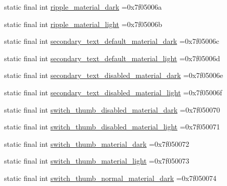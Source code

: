 \begin{DoxyCompactItemize}
\item 
static final int \mbox{\hyperlink{classbr_1_1unb_1_1cic_1_1mp_1_1marketmaster_1_1test_1_1R_1_1color_a2cbd224e0b149b5d8d99bd630850b3a3}{ripple\+\_\+material\+\_\+dark}} =0x7f05006a
\item 
static final int \mbox{\hyperlink{classbr_1_1unb_1_1cic_1_1mp_1_1marketmaster_1_1test_1_1R_1_1color_a64cb9dba74d31a5927d1c4c1df98b129}{ripple\+\_\+material\+\_\+light}} =0x7f05006b
\item 
static final int \mbox{\hyperlink{classbr_1_1unb_1_1cic_1_1mp_1_1marketmaster_1_1test_1_1R_1_1color_a6a5ced9689b83fcb9ed2a798d32bd301}{secondary\+\_\+text\+\_\+default\+\_\+material\+\_\+dark}} =0x7f05006c
\item 
static final int \mbox{\hyperlink{classbr_1_1unb_1_1cic_1_1mp_1_1marketmaster_1_1test_1_1R_1_1color_a4abc0ef09d23986b3fcf316ac119026e}{secondary\+\_\+text\+\_\+default\+\_\+material\+\_\+light}} =0x7f05006d
\item 
static final int \mbox{\hyperlink{classbr_1_1unb_1_1cic_1_1mp_1_1marketmaster_1_1test_1_1R_1_1color_a9d7f35df8f3fa9b85defa11812eb008f}{secondary\+\_\+text\+\_\+disabled\+\_\+material\+\_\+dark}} =0x7f05006e
\item 
static final int \mbox{\hyperlink{classbr_1_1unb_1_1cic_1_1mp_1_1marketmaster_1_1test_1_1R_1_1color_a563bf4461551943a0f6bbbf8636148ef}{secondary\+\_\+text\+\_\+disabled\+\_\+material\+\_\+light}} =0x7f05006f
\item 
static final int \mbox{\hyperlink{classbr_1_1unb_1_1cic_1_1mp_1_1marketmaster_1_1test_1_1R_1_1color_a3747cd3af18c1258d6661d2e0054a6c9}{switch\+\_\+thumb\+\_\+disabled\+\_\+material\+\_\+dark}} =0x7f050070
\item 
static final int \mbox{\hyperlink{classbr_1_1unb_1_1cic_1_1mp_1_1marketmaster_1_1test_1_1R_1_1color_af0b885a33dcd45cd10e80290fda78eec}{switch\+\_\+thumb\+\_\+disabled\+\_\+material\+\_\+light}} =0x7f050071
\item 
static final int \mbox{\hyperlink{classbr_1_1unb_1_1cic_1_1mp_1_1marketmaster_1_1test_1_1R_1_1color_add5099d38e636e16d04cb1f38dc12cac}{switch\+\_\+thumb\+\_\+material\+\_\+dark}} =0x7f050072
\item 
static final int \mbox{\hyperlink{classbr_1_1unb_1_1cic_1_1mp_1_1marketmaster_1_1test_1_1R_1_1color_ab57c8089f6c20941a5f74d491c41098f}{switch\+\_\+thumb\+\_\+material\+\_\+light}} =0x7f050073
\item 
static final int \mbox{\hyperlink{classbr_1_1unb_1_1cic_1_1mp_1_1marketmaster_1_1test_1_1R_1_1color_a15644bb78ff1330127c8f83d590ef769}{switch\+\_\+thumb\+\_\+normal\+\_\+material\+\_\+dark}} =0x7f050074

\end{DoxyCompactItemize}
